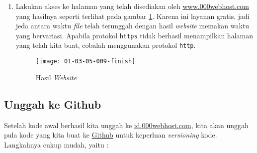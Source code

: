 \begin{enumerate}
	\item Lakukan akses ke halaman yang telah disediakan oleh \url{www.000webhost.com} yang hasilnya seperti terlihat pada gambar \ref{fig:01-03-05-009}. Karena ini layanan gratis, jadi jeda antara waktu \textit{file} telah terunggah dengan hasil \textit{website} memakan waktu yang bervariasi. Apabila protokol \texttt{https} tidak berhasil menampilkan halaman yang telah kita buat, cobalah menggunakan protokol \texttt{http}.
	
	\begin{figure}[H]
		\centering
		\texttt{[image: 01-03-05-009-finish]}
		\caption{Hasil \textit{Website}}
		\label{fig:01-03-05-009}
	\end{figure}
	
\end{enumerate}

\subsection{Unggah ke Github}

Setelah kode awal berhasil kita unggah ke \url{id.000webhost.com}, kita akan unggah pula kode yang kita buat ke \href{github.com}{Github} untuk keperluan \textit{versioning} kode. Langkahnya cukup mudah, yaitu :

